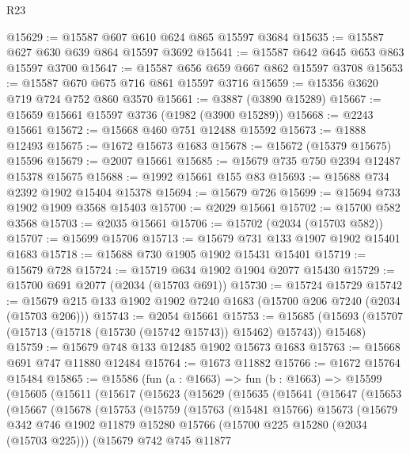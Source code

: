 \begin{lexlean}{R23}
\begin{coremodule}
@15629 := @15587 @607 @610 @624 @865 @15597 @3684
@15635 := @15587 @627 @630 @639 @864 @15597 @3692
@15641 := @15587 @642 @645 @653 @863 @15597 @3700
@15647 := @15587 @656 @659 @667 @862 @15597 @3708
@15653 := @15587 @670 @675 @716 @861 @15597 @3716
@15659 := @15356 @3620 @719 @724 @752 @860 @3570
@15661 := @3887 (@3890 @15289)
@15667 := @15659 @15661 @15597 @3736 (@1982 (@3900 @15289))
@15668 := @2243 @15661
@15672 := @15668 @460 @751 @12488 @15592
@15673 := @1888 @12493
@15675 := @1672 @15673 @1683
@15678 := @15672 (@15379 @15675) @15596
@15679 := @2007 @15661
@15685 := @15679 @735 @750 @2394 @12487 @15378 @15675
@15688 := @1992 @15661 @155 @83
@15693 := @15688 @734 @2392 @1902 @15404 @15378
@15694 := @15679 @726
@15699 := @15694 @733 @1902 @1909 @3568 @15403
@15700 := @2029 @15661
@15702 := @15700 @582 @3568
@15703 := @2035 @15661
@15706 := @15702 (@2034 (@15703 @582))
@15707 := @15699 @15706
@15713 := @15679 @731 @133 @1907 @1902 @15401 @1683
@15718 := @15688 @730 @1905 @1902 @15431 @15401
@15719 := @15679 @728
@15724 := @15719 @634 @1902 @1904 @2077 @15430
@15729 := @15700 @691 @2077 (@2034 (@15703 @691))
@15730 := @15724 @15729
@15742 := @15679 @215 @133 @1902 @1902 @7240 @1683 (@15700 @206 @7240 (@2034 (@15703 @206)))
@15743 := @2054 @15661
@15753 := @15685 (@15693 (@15707 (@15713 (@15718 (@15730 (@15742 @15743)) @15462) @15743)) @15468)
@15759 := @15679 @748 @133 @12485 @1902 @15673 @1683
@15763 := @15668 @691 @747 @11880 @12484
@15764 := @1673 @11882
@15766 := @1672 @15764 @15484
@15865 := @15586
    (fun (a : @1663) =>
    fun (b : @1663) =>
    @15599
      (@15605
        (@15611
          (@15617
            (@15623
              (@15629
                (@15635
                  (@15641
                    (@15647
                      (@15653
                        (@15667
                          (@15678
                            (@15753
                              (@15759
                                (@15763
                                  (@15481 @15766)
                                  @15673
                                  (@15679
                                    @342
                                    @746
                                    @1902
                                    @11879
                                    @15280
                                    @15766
                                    (@15700 @225 @15280 (@2034 (@15703 @225)))
                                    (@15679
                                      @742
                                      @745
                                      @11877

\end{coremodule}
\end{lexlean}
